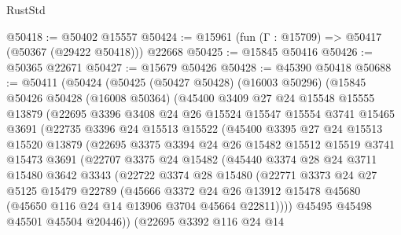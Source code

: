 \begin{lexlean}{RustStd}
\begin{coremodule}
@50418 := @50402 @15557
@50424 := @15961 (fun (Γ : @15709) => @50417 (@50367 (@29422 @50418))) @22668
@50425 := @15845 @50416
@50426 := @50365 @22671
@50427 := @15679 @50426
@50428 := @45390 @50418
@50688 := @50411
    (@50424
      (@50425
        (@50427 @50428)
        (@16003 @50296)
        (@15845
          @50426
          @50428
          (@16008 @50364)
          (@45400
            @3409
            @27
            @24
            @15548
            @15555
            @13879
            (@22695
              @3396
              @3408
              @24
              @26
              @15524
              @15547
              @15554
              @3741
              @15465
              @3691
              (@22735
                @3396
                @24
                @15513
                @15522
                (@45400
                  @3395
                  @27
                  @24
                  @15513
                  @15520
                  @13879
                  (@22695
                    @3375
                    @3394
                    @24
                    @26
                    @15482
                    @15512
                    @15519
                    @3741
                    @15473
                    @3691
                    (@22707
                      @3375
                      @24
                      @15482
                      (@45440
                        @3374
                        @28
                        @24
                        @3711
                        @15480
                        @3642
                        @3343
                        (@22722
                          @3374
                          @28
                          @15480
                          (@22771
                            @3373
                            @24
                            @27
                            @5125
                            @15479
                            @22789
                            (@45666
                              @3372
                              @24
                              @26
                              @13912
                              @15478
                              @45680
                              (@45650 @116 @24 @14 @13906 @3704 @45664 @22811))))
                        @45495
                        @45498
                        @45501
                        @45504
                        @20446))
                    (@22695
                      @3392
                      @116
                      @24
                      @14

\end{coremodule}
\end{lexlean}

